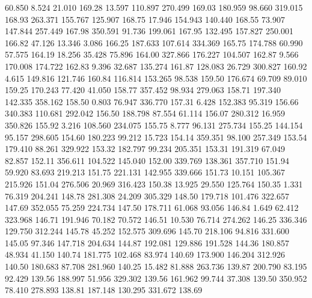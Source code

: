   60.850    8.524   21.010       169.28
  13.597  110.897  270.499       169.03
 180.959   98.660  319.015       168.93
 263.371  155.767  125.907       168.75
  17.946  154.943  140.440       168.55
  73.907  147.844  257.449       167.98
 350.591   91.736  199.061       167.95
 132.495  157.827  250.001       166.82
  47.126   13.346    3.086       166.25
 187.633  107.614  334.369       165.75
 174.788   60.990   57.575       164.19
  18.256   35.428   75.896       164.00
 327.866  176.227  104.507       162.87
   9.566  170.008  174.722       162.83
   9.396   32.687  135.274       161.87
 128.083   26.729  300.827       160.92
   4.615  149.816  121.746       160.84
 116.814  153.265   98.538       159.50
 176.674   69.709   89.010       159.25
 170.243   77.420   41.050       158.77
 357.452   98.934  279.063       158.71
 197.340  142.335  358.162       158.50
   0.803   76.947  336.770       157.31
   6.428  152.383   95.319       156.66
 340.383  110.681  292.042       156.50
 188.798   87.554   61.114       156.07
 280.312   16.959  350.826       155.92
   3.216  108.560  234.075       155.75
   8.777   96.131  275.734       155.25
 144.154   95.157  298.605       154.60
 180.223   99.212   15.723       154.14
 359.351   98.100  257.349       153.54
 179.410   88.261  329.922       153.32
 182.797   99.234  205.351       153.31
 191.319   67.049   82.857       152.11
 356.611  104.522  145.040       152.00
 339.769  138.361  357.710       151.94
  59.920   83.693  219.213       151.75
 221.131  142.955  339.666       151.73
  10.151  105.367  215.926       151.04
 276.506   20.969  316.423       150.38
  13.925   29.550  125.764       150.35
   1.331   76.319  204.241       148.78
 281.308   24.209  305.329       148.50
 179.718  101.476  322.657       147.69
 352.055   75.259  224.734       147.50
 178.711   61.068   93.056       146.84
   1.649   62.412  323.968       146.71
 191.946   70.182   70.572       146.51
  10.530   76.714  274.262       146.25
 336.346  129.750  312.244       145.78
  45.252  152.575  309.696       145.70
 218.106   94.816  331.600       145.05
  97.346  147.718  204.634       144.87
 192.081  129.886  191.528       144.36
 180.857   48.934   41.150       140.74
 181.775  102.468   83.974       140.69
 173.900  146.204  312.926       140.50
 180.683   87.708  281.960       140.25
  15.482   81.888  263.736       139.87
 200.790   83.195   92.429       139.56
 188.997   51.956  329.302       139.56
 161.962   99.744   37.308       139.50
 350.952   78.410  278.893       138.81
 187.148  130.295  331.672       138.69
